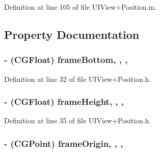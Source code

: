 Definition at line 105 of file U\+I\+View+\+Position.\+m.



\subsection{Property Documentation}
\hypertarget{category_u_i_view_07_position_08_a6a730310961d877923cbe081dc3e5b39}{
\subsubsection[{frame\+Bottom}]{\setlength{\rightskip}{0pt plus 5cm}-\/ (C\+G\+Float) frame\+Bottom\hspace{0.3cm}{\ttfamily [read]}, {\ttfamily [write]}, {\ttfamily [nonatomic]}, {\ttfamily [assign]}}}\label{category_u_i_view_07_position_08_a6a730310961d877923cbe081dc3e5b39}


Definition at line 32 of file U\+I\+View+\+Position.\+h.

\hypertarget{category_u_i_view_07_position_08_a96659e2eec8d359d96a460582247f4c8}{
\subsubsection[{frame\+Height}]{\setlength{\rightskip}{0pt plus 5cm}-\/ (C\+G\+Float) frame\+Height\hspace{0.3cm}{\ttfamily [read]}, {\ttfamily [write]}, {\ttfamily [nonatomic]}, {\ttfamily [assign]}}}\label{category_u_i_view_07_position_08_a96659e2eec8d359d96a460582247f4c8}


Definition at line 35 of file U\+I\+View+\+Position.\+h.

\hypertarget{category_u_i_view_07_position_08_af1d70399207fb8befa7e0f287bf23368}{
\subsubsection[{frame\+Origin}]{\setlength{\rightskip}{0pt plus 5cm}-\/ (C\+G\+Point) frame\+Origin\hspace{0.3cm}{\ttfamily [read]}, {\ttfamily [write]}, {\ttfamily [nonatomic]}, {\ttfamily [assign]}}}\label{category_u_i_view_07_position_08_af1d70399207fb8befa7e0f287bf23368}


